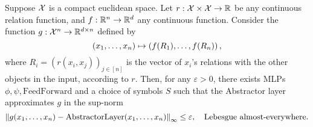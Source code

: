 \begin{theorem}
    Suppose ${\mathcal{X}}$ is a compact euclidean space. Let $r: {\mathcal{X}} \times {\mathcal{X}} \to \mathbb{R}$ be any continuous relation function, and $f: \mathbb{R}^n \to \mathbb{R}^d$ any continuous function. Consider the function $g: {\mathcal{X}}^n \to \mathbb{R}^{d \times n}$ defined by
    \begin{equation*}
        (x_1, \ldots, x_n) \mapsto \left(f(R_1), \ldots, f(R_n)\right),
    \end{equation*}
    where $R_i = {(r(x_i, x_j))}_{j \in [n]}$ is the vector of $x_i$'s relations with the other objects in the input, according to $r$. Then, for any $\varepsilon > 0$, there exists MLPs $\phi, \psi, \mathrm{FeedForward}$ and a choice of symbols $S$ such that the Abstractor layer approximates $g$ in the sup-norm
    \begin{equation*}
        \left\lVert g(x_1, \ldots, x_n) - \mathrm{AbstractorLayer}(x_1, \ldots, x_n)\right\rVert_{\infty} \leq \varepsilon, \quad \text{Lebesgue almost-everywhere.}
    \end{equation*}
\end{theorem}
